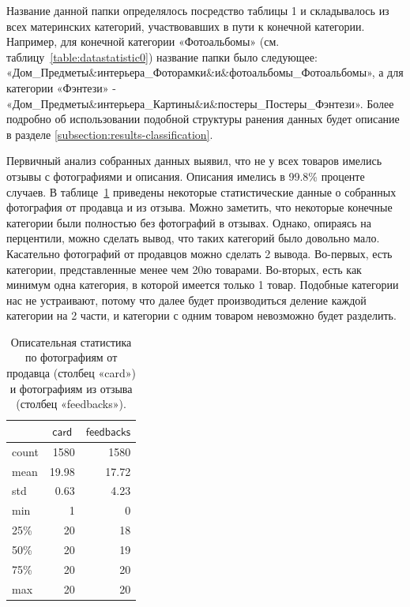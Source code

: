 \documentclass[a4paper,12pt]{extarticle}
\begin{document}
Название данной папки определялось посредство таблицы 1 и складывалось из всех материнских категорий, участвовавших в пути к конечной категории. Например, для конечной категории «Фотоальбомы» (см. таблицу~\ref{table:datastatistic0}) название папки было следующее: \\ «Дом\_Предметы\&интерьера\_Фоторамки\&и\&фотоальбомы\_Фотоальбомы», а для категории «Фэнтези» - «Дом\_Предметы\&интерьера\_Картины\&и\&постеры\_Постеры\_Фэнтези». Более подробно об использовании подобной структуры ранения данных будет описание в разделе \ref{subsection:results-classification}.

Первичный анализ собранных данных выявил, что не у всех товаров имелись отзывы с фотографиями и описания. Описания имелись в 99.8\% проценте случаев. В таблице~\ref{table:datastatistic1} приведены некоторые статистические данные о собранных фотография от продавца и из отзыва. Можно заметить, что некоторые конечные категории были полностью без фотографий в отзывах. Однако, опираясь на перцентили, можно сделать вывод, что таких категорий было довольно мало. Касательно фотографий от продавцов можно сделать 2 вывода. Во-первых, есть категории, представленные менее чем 20ю товарами. Во-вторых, есть как минимум одна категория, в которой имеется только 1 товар. Подобные категории нас не устраивают, потому что далее будет производиться деление каждой категории на 2 части, и категории с одним товаром невозможно будет разделить.

\begin{table}[ht]
	\caption{Описательная статистика по фотографиям от продавца (столбец «card») и фотографиям из отзыва (столбец «feedbacks»).}
	\label{table:datastatistic1}
	\footnotesize
	\centering
	\begin{tabular}{l|rr}
		\toprule
		{} & \multicolumn{1}{c}{$\mathsf{card}$} & \multicolumn{1}{c}{$\mathsf{feedbacks}$}\\
		\midrule
		count &	1580  & 1580\\
		mean  & 19.98 & 17.72\\
		std   & 0.63  &	4.23\\
		min   &	1     &	0\\
		25\%  &	20    &	18\\
		50\%  &	20    &	19\\
		75\%  &	20    &	20\\
		max   &	20    &	20\\
		\bottomrule
	\end{tabular}
\end{table}
\end{document}
